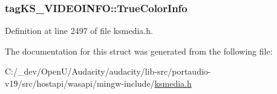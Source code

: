 \subsubsection[{\texorpdfstring{True\+Color\+Info}{TrueColorInfo}}]{ tag\+K\+S\+\_\+\+V\+I\+D\+E\+O\+I\+N\+F\+O\+::\+True\+Color\+Info}\hypertarget{structtag_k_s___v_i_d_e_o_i_n_f_o_aa2e9c6ea3391913150f01b5b12c9f8e1}{}\label{structtag_k_s___v_i_d_e_o_i_n_f_o_aa2e9c6ea3391913150f01b5b12c9f8e1}


Definition at line 2497 of file ksmedia.\+h.



The documentation for this struct was generated from the following file\+:\begin{DoxyCompactItemize}
\item 
C\+:/\+\_\+dev/\+Open\+U/\+Audacity/audacity/lib-\/src/portaudio-\/v19/src/hostapi/wasapi/mingw-\/include/\hyperlink{ksmedia_8h}{ksmedia.\+h}\end{DoxyCompactItemize}
